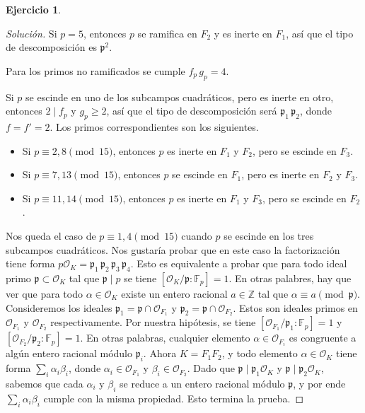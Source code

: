 \documentclass{article}
\newcounter{tarea}
\theoremstyle{definition}
\newtheorem{ejercicio}{Ejercicio}[tarea]
\newenvironment{solucion}{\begin{proof}[Solución]}{\end{proof}}
\newcommand{\FF}{\mathbb{F}}
\newcommand{\ZZ}{\mathbb{Z}}
\renewcommand{\O}{\mathcal{O}}
\begin{document}
\begin{ejercicio}
\begin{solucion}
    Si $p = 5$, entonces $p$ se ramifica en $F_2$ y es inerte en $F_1$, así
    que el tipo de descomposición es $\mathfrak{p}^2$.

    Para los primos no ramificados se cumple $f_p\,g_p = 4$.

    Si $p$ se escinde en uno de los subcampos cuadráticos, pero es inerte en
    otro, entonces $2 \mid f_p$ y $g_p \ge 2$, así que el tipo de
    descomposición será $\mathfrak{p}_1\,\mathfrak{p}_2$, donde $f = f' = 2$.
    Los primos correspondientes son los siguientes.

    \begin{itemize}
    \item Si $p \equiv 2, 8 \pmod{15}$, entonces $p$ es inerte en $F_1$ y $F_2$,
      pero se escinde en $F_3$.

    \item Si $p \equiv 7, 13 \pmod{15}$, entonces $p$ se escinde en $F_1$, pero
      es inerte en $F_2$ y $F_3$.

    \item Si $p \equiv 11, 14 \pmod{15}$, entonces $p$ es inerte en $F_1$ y
      $F_3$, pero se escinde en $F_2$.
    \end{itemize}

    Nos queda el caso de $p \equiv 1,4 \pmod{15}$ cuando $p$ se escinde en los
    tres subcampos cuadráticos. Nos gustaría probar que en este caso la
    factorización tiene forma
    $p\O_K = \mathfrak{p}_1\,\mathfrak{p}_2\,\mathfrak{p}_3\,\mathfrak{p}_4$.
    Esto es equivalente a probar que para todo ideal primo
    $\mathfrak{p} \subset \O_K$ tal que $\mathfrak{p} \mid p$ se tiene
    $[\O_K/\mathfrak{p} : \FF_p] = 1$. En otras palabres, hay que ver que para
    todo $\alpha \in \O_K$ existe un entero racional $a \in \ZZ$ tal que
    $\alpha \equiv a \pmod{\mathfrak{p}}$. Consideremos los ideales
    $\mathfrak{p}_1 = \mathfrak{p} \cap \O_{F_1}$ y
    $\mathfrak{p}_2 = \mathfrak{p} \cap \O_{F_2}$. Estos son ideales primos en
    $\O_{F_1}$ y $\O_{F_2}$ respectivamente. Por nuestra hipótesis, se tiene
    $[\O_{F_1}/\mathfrak{p}_1 : \FF_p] = 1$ y $[\O_{F_2}/\mathfrak{p}_2 : \FF_p]
    = 1$. En otras palabras, cualquier elemento $\alpha \in \O_{F_i}$ es
    congruente a algún entero racional módulo $\mathfrak{p}_i$. Ahora
    $K = F_1 F_2$, y todo elemento $\alpha \in \O_K$ tiene forma
    $\sum_i \alpha_i \beta_i$, donde $\alpha_i \in \O_{F_1}$ y
    $\beta_i \in \O_{F_2}$. Dado que
    $\mathfrak{p} \mid \mathfrak{p}_1 \O_K$ y
    $\mathfrak{p} \mid \mathfrak{p}_2 \O_K$, sabemos que cada $\alpha_i$ y
    $\beta_i$ se reduce a un entero racional módulo $\mathfrak{p}$, y por ende
    $\sum_i \alpha_i \beta_i$ cumple con la misma propiedad. Esto termina la
    prueba.


\end{solucion}
\end{ejercicio}
\end{document}
